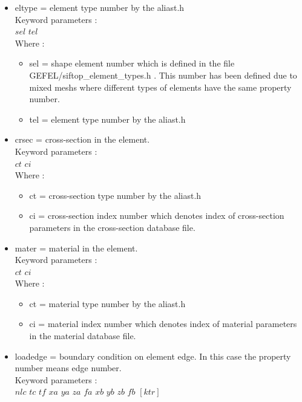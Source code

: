\documentclass[12pt]{book}
\begin{document}
\begin{itemize}
\item eltype = element type number by the aliast.h\\
         Keyword parameters :\\
         $sel$ $tel$\\
         Where :
         \begin{itemize}
         \item sel = shape element number which is defined in the file
               GEFEL/siftop\_element\_types.h . This number has been defined
               due to mixed meshs where different types of elements
               have the same property number.
         \item tel = element type number by the aliast.h
         \end{itemize}
\item crsec  = cross-section in the element.\\
         Keyword parameters :\\
         $ct$ $ci$\\
         Where :
         \begin{itemize}
         \item ct = cross-section type number by the aliast.h
         \item ci = cross-section index number which denotes index of
              cross-section parameters in the cross-section database file.
         \end{itemize}
\item mater = material in the element.\\
        Keyword parameters :\\
        $ct$ $ci$\\
        Where :
        \begin{itemize}
        \item ct = material type number by the aliast.h
        \item ci = material index number which denotes index of
             material parameters in the material database file.
        \end{itemize}
\item loadedge = boundary condition on element edge. In this case the property number
           means edge number.\\
           Keyword parameters :\\
           $nlc$ $tc$ $tf$ $xa$ $ya$ $za$ $fa$ $xb$ $yb$ $zb$ $fb$ $[ktr]$\\

\end{itemize}
\end{document}
